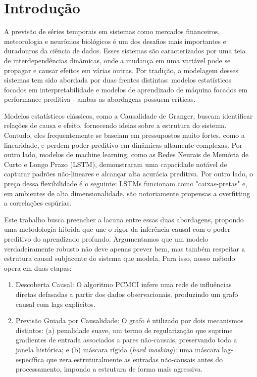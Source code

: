 \documentclass[12pt, a4paper]{article}
\begin{document}
\section{Introdução}

A previsão de séries temporais em sistemas como mercados financeiros, meteorologia e neurônios biológicos é um dos desafios mais importantes e duradouros da ciência de dados. Esses sistemas são caracterizados por uma teia de interdependências dinâmicas, onde a mudança em uma variável pode se propagar e causar efeitos em várias outras. Por tradição, a modelagem desses sistemas tem sido abordada por duas frentes distintas: modelos estatísticos focados em interpretabilidade e modelos de aprendizado de máquina focados em performance preditiva - ambas as abordagens possuem críticas.

Modelos estatísticos clássicos, como a Causalidade de Granger, buscam identificar relações de causa e efeito, fornecendo ideias sobre a estrutura do sistema. Contudo, eles frequentemente se baseiam em pressupostos muito fortes, como a linearidade, e perdem poder preditivo em dinâmicas altamente complexas. Por outro lado, modelos de machine learning, como as Redes Neurais de Memória de Curto e Longo Prazo (LSTM), demonstraram uma capacidade notável de capturar padrões não-lineares e alcançar alta acurácia preditiva. Por outro lado, o preço dessa flexibilidade é o seguinte: LSTMs funcionam como "caixas-pretas" e, em ambientes de alta dimensionalidade, são notoriamente propensas a overfitting a correlações espúrias.

Este trabalho busca preencher a lacuna entre essas duas abordagens, propondo uma metodologia híbrida que une o rigor da inferência causal com o poder preditivo do aprendizado profundo. Argumentamos que um modelo verdadeiramente robusto não deve apenas prever bem, mas também respeitar a estrutura causal subjacente do sistema que modela. Para isso, nosso método opera em duas etapas:
\begin{enumerate}
    \item Descoberta Causal: O algoritmo PCMCI infere uma rede de influências diretas defasadas a partir dos dados observacionais, produzindo um grafo causal com lags explícitos.
    \item Previsão Guiada por Causalidade: O grafo é utilizado por dois mecanismos distintos: (a) penalidade suave, um termo de regularização que suprime gradientes de entrada associados a pares não-causais, preservando toda a janela histórica; e (b) máscara rígida (\emph{hard masking}): uma máscara lag-específica que zera estruturalmente as entradas não-causais antes do processamento, impondo a estrutura de forma mais agressiva.
\end{enumerate}
\end{document}
